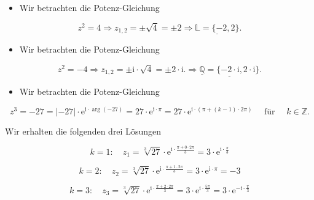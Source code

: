 \documentclass[10pt]{article}
\begin{document}
\begin{itemize}
  \item Wir betrachten die Potenz-Gleichung
\end{itemize}


\begin{equation*}
z^{2}=4 \Rightarrow z_{1,2}= \pm \sqrt{4}= \pm 2 \Rightarrow \underline{\mathbb{L}=\{-2,2\}} . \tag{5.35}
\end{equation*}


\begin{itemize}
  \item Wir betrachten die Potenz-Gleichung
\end{itemize}


\begin{equation*}
z^{2}=-4 \Rightarrow z_{1,2}= \pm \mathrm{i} \cdot \sqrt{4}= \pm 2 \cdot \mathrm{i} . \Rightarrow \underline{\underline{\mathbb{Q}}=\{-2 \cdot \mathrm{i}, 2 \cdot \mathrm{i}\}} . \tag{5.36}
\end{equation*}


\begin{itemize}
  \item Wir betrachten die Potenz-Gleichung
\end{itemize}


\begin{equation*}
z^{3}=-27=|-27| \cdot \mathrm{e}^{\mathrm{i} \cdot \arg (-27)}=27 \cdot \mathrm{e}^{\mathrm{i} \cdot \pi}=27 \cdot \mathrm{e}^{\mathrm{i} \cdot(\pi+(k-1) \cdot 2 \pi)} \quad \text { für } \quad k \in \mathbb{Z} . \tag{5.37}
\end{equation*}


Wir erhalten die folgenden drei Lösungen


\begin{equation*}
k=1: \quad z_{1}=\sqrt[3]{27} \cdot \mathrm{e}^{\mathrm{i} \cdot \frac{\pi+0 \cdot 2 \pi}{3}}=3 \cdot \mathrm{e}^{\mathrm{i} \cdot \frac{\pi}{3}} \tag{5.38}
\end{equation*}



\begin{equation*}
k=2: \quad z_{2}=\sqrt[3]{27} \cdot \mathrm{e}^{\mathrm{i} \cdot \frac{\pi+1 \cdot 2 \pi}{3}}=3 \cdot \mathrm{e}^{\mathrm{i} \cdot \pi}=-3 \tag{5.39}
\end{equation*}



\begin{equation*}
k=3: \quad z_{3}=\sqrt[3]{27} \cdot \mathrm{e}^{\mathrm{i} \cdot \frac{\pi+2 \cdot 2 \pi}{3}}=3 \cdot \mathrm{e}^{\mathrm{i} \cdot \frac{5 \pi}{3}}=3 \cdot \mathrm{e}^{-\mathrm{i} \cdot \frac{\pi}{3}} \tag{5.40}
\end{equation*}
\end{document}
